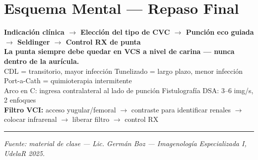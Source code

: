 \clearpage
\section*{Esquema Mental --- Repaso Final}

\begin{cajakeypoints}
	\begin{center}
		\textbf{\color{azulprincipal}
			Indicación clínica $\rightarrow$ Elección del tipo de CVC $\rightarrow$ Punción eco guiada $\rightarrow$ Seldinger $\rightarrow$ Control RX de punta}\\[0.4em]
		\textbf{\color{naranjadestacado}
			La punta siempre debe quedar en VCS a nivel de carina --- nunca dentro de la aurícula.}\\[0.3em]
		CDL = transitorio, mayor infección \quad Tunelizado = largo plazo, menor infección \quad Port-a-Cath = quimioterapia intermitente\\[0.3em]
		Arco en C: ingresa contralateral al lado de punción \quad Fistulografía DSA: 3--6 img/s, 2 enfoques\\[0.3em]
		\textbf{Filtro VCI:} acceso yugular/femoral $\to$ contraste para identificar renales $\to$ colocar infrarenal $\to$ liberar filtro $\to$ control RX
	\end{center}
\end{cajakeypoints}

\vspace{1em}
\hrule
\vspace{0.5em}
{\footnotesize \textit{Fuente: material de clase --- Lic. Germán Boz ---
		Imagenología Especializada I, UdelaR 2025.}}